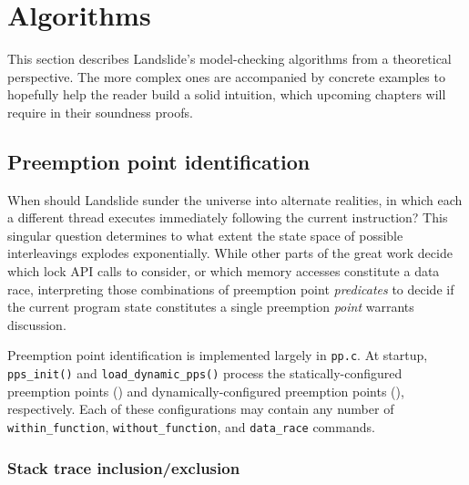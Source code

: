 
\section{Algorithms}
\label{sec:landslide-algs}

This section describes Landslide's model-checking algorithms from a theoretical perspective.
The more complex ones are accompanied by concrete examples to hopefully help the reader build a solid intuition,
which upcoming chapters will require in their soundness proofs.


\subsection{Preemption point identification}
\label{sec:landslide-pps}

When should Landslide sunder the universe into alternate realities,
in which each a different thread executes immediately following the current instruction?
This singular question determines to what extent the state space of possible interleavings explodes exponentially.
While other parts of
the great work %
decide which lock API calls to consider,
or which memory accesses constitute a data race,
interpreting those combinations of preemption point {\em predicates}
to decide if the current program state constitutes a single preemption {\em point}
warrants discussion.

Preemption point identification is implemented largely in {\tt pp.c}.
At startup, {\tt pps\_init()} and {\tt load\_dynamic\_pps()} process the
statically-configured preemption points (\sect{\ref{sec:landslide-staticconfig}})
and dynamically-configured preemption points (\sect{\ref{sec:landslide-dynamicconfig}}),
respectively.
Each of these configurations may contain any number of
{\tt within\_function}, {\tt without\_function}, and {\tt data\_\allowbreak{}race} commands.

\subsubsection{Stack trace inclusion/exclusion}

